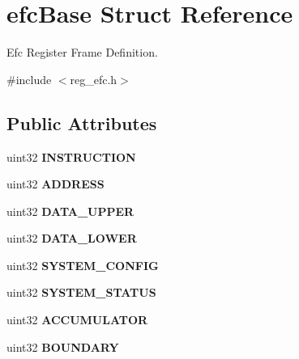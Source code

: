\hypertarget{structefcBase}{}\section{efc\+Base Struct Reference}
\label{structefcBase}


Efc Register Frame Definition.  




{\ttfamily \#include $<$reg\+\_\+efc.\+h$>$}

\subsection*{Public Attributes}
\begin{DoxyCompactItemize}
\item 
\mbox{\label{structefcBase_afbbc639cabe7da354eef707326068173}} 
uint32 {\bfseries I\+N\+S\+T\+R\+U\+C\+T\+I\+ON}
\item 
\mbox{\label{structefcBase_a637145f888eb6c30585c431840cbeaf5}} 
uint32 {\bfseries A\+D\+D\+R\+E\+SS}
\item 
\mbox{\label{structefcBase_a561b4f91193955fe441658fdc8a44a41}} 
uint32 {\bfseries D\+A\+T\+A\+\_\+\+U\+P\+P\+ER}
\item 
\mbox{\label{structefcBase_ab01577c5e0ae559e0163aa447b3aaebd}} 
uint32 {\bfseries D\+A\+T\+A\+\_\+\+L\+O\+W\+ER}
\item 
\mbox{\label{structefcBase_aa6fd1e6be39e0f382419f48f857e4e96}} 
uint32 {\bfseries S\+Y\+S\+T\+E\+M\+\_\+\+C\+O\+N\+F\+IG}
\item 
\mbox{\label{structefcBase_a2c11a26c92294c63805d97050cf18d6d}} 
uint32 {\bfseries S\+Y\+S\+T\+E\+M\+\_\+\+S\+T\+A\+T\+US}
\item 
\mbox{\label{structefcBase_a0967145778a6a7fb46f09d9994ac592c}} 
uint32 {\bfseries A\+C\+C\+U\+M\+U\+L\+A\+T\+OR}
\item 
\mbox{\label{structefcBase_a905cddecdf6419fa2951a10cdd39b96f}} 
uint32 {\bfseries B\+O\+U\+N\+D\+A\+RY}
\item 
\mbox{\label{structefcBase_a38c5d9dcb117404d4c2b02e9dd342742}} 

\end{DoxyCompactItemize}
